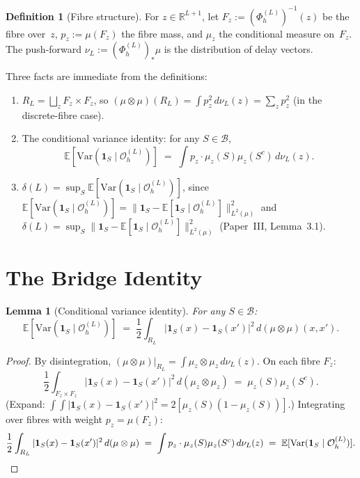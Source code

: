 \documentclass[11pt]{article}
\newtheorem{lemma}[theorem]{Lemma}
\theoremstyle{definition}
\newtheorem{definition}[theorem]{Definition}
\newcommand{\Bcal}{\mathcal{B}}
\newcommand{\OL}{\mathcal{O}_h^{(L)}}
\newcommand{\PhiL}{\Phi_h^{(L)}}
\newcommand{\Lp}[1]{L^{#1}}
\newcommand{\RL}{R_L}
\newcommand{\dL}{\delta(L)}
\begin{document}
\begin{definition}[Fibre structure]
For $z \in \mathbb{R}^{L+1}$, let $F_z := (\PhiL)^{-1}(z)$ be the fibre over~$z$,
$p_z := \mu(F_z)$ the fibre mass, and $\mu_z$ the conditional measure on~$F_z$.
The push-forward $\nu_L := (\PhiL)_*\!\mu$ is the distribution of delay vectors.
\end{definition}

Three facts are immediate from the definitions:
\begin{enumerate}[label=(\alph*)]
  \item $\RL = \bigsqcup_z F_z \times F_z$, so
    $(\mu \otimes \mu)(\RL) = \int p_z^2\, d\nu_L(z) = \sum_z p_z^2$
    (in the discrete-fibre case).
  \item The conditional variance identity:
    for any $S \in \Bcal$,
    \[
      \mathbb{E}[\mathrm{Var}(\mathbf{1}_S \mid \OL)]
      \;=\; \int p_z \cdot \mu_z(S)\mu_z(S^c)\, d\nu_L(z).
    \]
  \item $\dL = \sup_S \mathbb{E}[\mathrm{Var}(\mathbf{1}_S \mid \OL)]$,
    since $\mathbb{E}[\mathrm{Var}(\mathbf{1}_S \mid \OL)]
    = \|\mathbf{1}_S - \mathbb{E}[\mathbf{1}_S \mid \OL]\|_{\Lp{2}(\mu)}^2$
    and $\dL = \sup_S \|\mathbf{1}_S - \mathbb{E}[\mathbf{1}_S \mid \OL]\|_{\Lp{2}(\mu)}^2$
    (Paper~III, Lemma~3.1).
\end{enumerate}

\section{The Bridge Identity}

\begin{lemma}[Conditional variance identity]
\label{lem:bridge}
For any $S \in \Bcal$:
\[
  \mathbb{E}[\mathrm{Var}(\mathbf{1}_S \mid \OL)]
  \;=\;
  \frac{1}{2}
  \int_{\RL} |\mathbf{1}_S(x) - \mathbf{1}_S(x')|^2\,
  d(\mu \otimes \mu)(x, x').
\]
\end{lemma}

\begin{proof}
By disintegration, $(\mu \otimes \mu)|_{\RL} = \int \mu_z \otimes \mu_z\, d\nu_L(z)$.
On each fibre $F_z$:
\[
  \frac{1}{2}\int_{F_z \times F_z}
  |\mathbf{1}_S(x) - \mathbf{1}_S(x')|^2\, d(\mu_z \otimes \mu_z)
  \;=\; \mu_z(S)\mu_z(S^c).
\]
(Expand: $\int\int |\mathbf{1}_S(x) - \mathbf{1}_S(x')|^2 = 2[\mu_z(S)(1-\mu_z(S))]$.)
Integrating over fibres with weight $p_z = \mu(F_z)$:
\[
  \frac{1}{2}\int_{\RL}|\mathbf{1}_S(x) - \mathbf{1}_S(x')|^2\,d(\mu\otimes\mu)
  \;=\; \int p_z \cdot \mu_z(S)\mu_z(S^c)\,d\nu_L(z)
  \;=\; \mathbb{E}[\mathrm{Var}(\mathbf{1}_S \mid \OL)]. \qedhere
\]
\end{proof}
\end{document}
